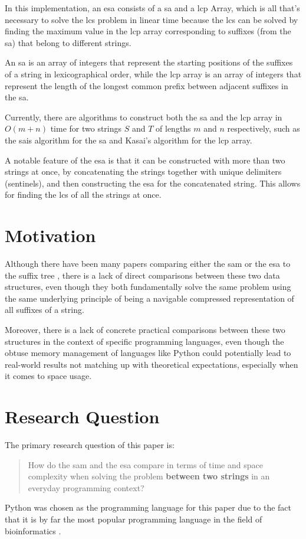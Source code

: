 In this implementation, an \acrfull{esa} consists of a \acrfull{sa} and a \acrfull{lcp} Array, 
which is all that's necessary to solve the \acrshort{lcs} problem in linear time because the \acrshort{lcs} can be solved by 
finding the maximum value in the \acrshort{lcp} array corresponding to suffixes (from the \acrshort{sa}) that belong to different strings.

An \acrshort{sa} is an array of integers that represent the starting positions of the suffixes of a string in lexicographical order,
while the \acrshort{lcp} array is an array of integers that represent the length of the longest common prefix between adjacent suffixes in the \acrshort{sa}\cite{esadef}.

Currently, there are algorithms to construct both the \acrshort{sa} and the \acrshort{lcp} array in 
$O(m+n)$ time for two strings $S$ and $T$ of lengths $m$ and $n$ respectively, 
such as the \acrfull{sais} algorithm for the \acrshort{sa}\cite{sais} and Kasai's algorithm for the \acrshort{lcp} array\cite{kasai}.

A notable feature of the \acrshort{esa} is that it can be constructed with more than two strings at once,
by concatenating the strings together with unique delimiters (\gls{sentinel}s), and then constructing the \acrshort{esa} for the concatenated string.
This allows for finding the \acrshort{lcs} of all the strings at once.

\section{Motivation}

Although there have been many papers comparing either the \acrshort{sam} or the \acrshort{esa} to the suffix tree \cite{samdef,sam,crochemore1994text,esadef,suffixarrays}, 
there is a lack of direct comparisons between these two data structures,
even though they both fundamentally solve the same problem using the same underlying principle of being a navigable compressed representation of all suffixes of a string.

Moreover, there is a lack of concrete practical comparisons between these two structures in the context of specific programming languages,
even though the obtuse memory management of languages like Python\cite{python} could potentially lead to real-world results not matching up with theoretical expectations, especially when it comes to space usage.

\section{Research Question}
The primary research question of this paper is:
\begin{quote}
  How do the \acrshort{sam} and the \acrshort{esa} compare in terms of time and space complexity when solving the  problem \textbf{between two strings} in an everyday programming context?
\end{quote}

Python\cite{python} was chosen as the programming language for this paper due to the fact that it is by far the most popular programming language in the field of bioinformatics \cite{pythonproof}.